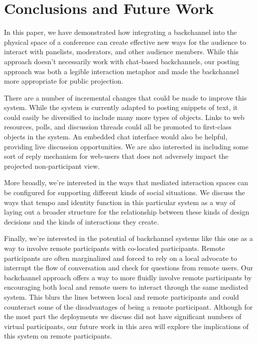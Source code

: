 \section{Conclusions and Future Work}
In this paper, we have demonstrated how integrating a backchannel into the physical space of a conference can create effective new ways for the audience to interact with panelists, moderators, and other audience members. While this approach doesn't necessarily work with chat-based backchannels, our posting approach was both a legible interaction metaphor and made the backchannel more appropriate for public projection.

There are a number of incremental changes that could be made to improve this system. While the system is currently adapted to posting snippets of text, it could easily be diversified to include many more types of objects. Links to web resources, polls, and discussion threads could all be promoted to first-class objects in the system. An embedded chat interface would also be helpful, providing live discussion opportunities. We are also interested in including some sort of reply mechanism for web-users that does not adversely impact the projected non-participant view. 

More broadly, we're interested in the ways that mediated interaction spaces can be configured for supporting different kinds of social situations. We discuss the ways that tempo and identity function in this particular system as a way of laying out a broader structure for the relationship between these kinds of design decisions and the kinds of interactions they create. 

Finally, we're interested in the potential of backchannel systems like this one as a way to involve remote participants with co-located participants. Remote participants are often marginalized and forced to rely on a local advocate to interrupt the flow of conversation and check for questions from remote users. Our backchannel approach offers a way to more fluidly involve remote participants by encouraging both local and remote users to interact through the same mediated system. This blurs the lines between local and remote participants and could counteract some of the disadvantages of being a remote participant. Although for the most part the deployments we discuss did not have significant numbers of virtual participants, our future work in this area will explore the implications of this system on remote participants.
